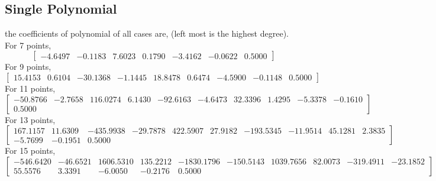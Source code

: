 \documentclass{article}
\newcommand{\bmat}[1]{\begin{bmatrix} #1 \end{bmatrix}}
\begin{document}
\subsection*{Single Polynomial}
the coefficients of polynomial of all cases are, (left most is the highest degree).
\\
For 7 points,
$$\bmat{-4.6497  & -0.1183 &   7.6023 &   0.1790  & -3.4162 &  -0.0622 &   0.5000}$$
For 9 points,
$$\bmat{15.4153  &  0.6104&  -30.1368 &  -1.1445 &  18.8478  &  0.6474 &  -4.5900  & -0.1148  &  0.5000}$$
For 11 points,
$$\bmat{-50.8766  & -2.7658 & 116.0274 &   6.1430 & -92.6163  & -4.6473  & 32.3396  &  1.4295  & -5.3378  & -0.1610\\ 0.5000}$$
For 13 points,
$$\bmat{167.1157 &  11.6309 &-435.9938 & -29.7878 & 422.5907  & 27.9182 &-193.5345 & -11.9514  & 45.1281  &  2.3835  \\ -5.7699  & -0.1951   & 0.5000}$$
For 15 points,
$$\bmat{-546.6420 & -46.6521&  1606.5310&   135.2212&    -1830.1796&   -150.5143&    1039.7656&     82.0073&    -319.4911&  -23.1852\\ 55.5576&   3.3391&  -6.0050& -0.2176&   0.5000}$$
\end{document}
